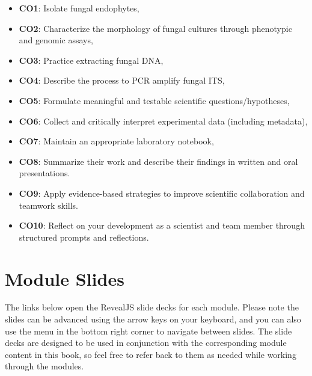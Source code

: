 \documentclass[
  letterpaper,
  DIV=11,
  numbers=noendperiod]{scrreprt}
\providecommand{\tightlist}{%
  \setlength{\itemsep}{0pt}\setlength{\parskip}{0pt}}
\begin{document}
\begin{itemize}
\tightlist
\item
  \textbf{CO1}: Isolate fungal endophytes,
\item
  \textbf{CO2}: Characterize the morphology of fungal cultures through
  phenotypic and genomic assays,
\item
  \textbf{CO3}: Practice extracting fungal DNA,
\item
  \textbf{CO4}: Describe the process to PCR amplify fungal ITS,
\item
  \textbf{CO5}: Formulate meaningful and testable scientific
  questions/hypotheses,
\item
  \textbf{CO6}: Collect and critically interpret experimental data
  (including metadata),
\item
  \textbf{CO7}: Maintain an appropriate laboratory notebook,
\item
  \textbf{CO8}: Summarize their work and describe their findings in
  written and oral presentations.
\item
  \textbf{CO9}: Apply evidence-based strategies to improve scientific
  collaboration and teamwork skills.
\item
  \textbf{CO10}: Reflect on your development as a scientist and team
  member through structured prompts and reflections.
\end{itemize}

\section*{Module Slides}\label{module-slides}


The links below open the RevealJS slide decks for each module. Please
note the slides can be advanced using the arrow keys on your keyboard,
and you can also use the menu in the bottom right corner to navigate
between slides. The slide decks are designed to be used in conjunction
with the corresponding module content in this book, so feel free to
refer back to them as needed while working through the modules.
\end{document}
